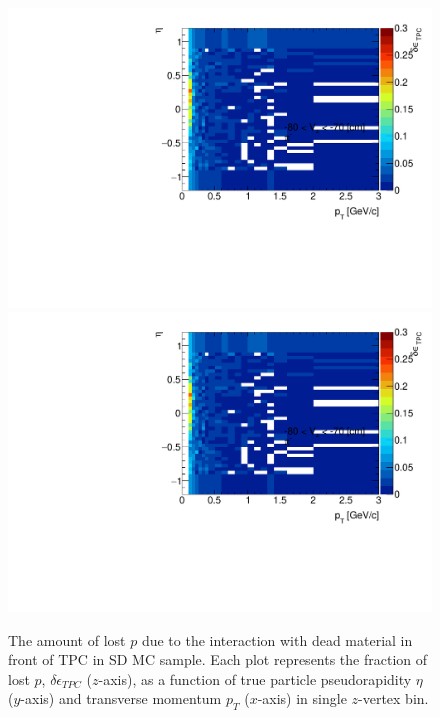 \begin{figure}[H]
	\caption[The amount of lost $p$ due to the interaction with dead material in front of TPC as a function of $p_T$, $\eta$ and $z$-vertex in SD]{The amount of lost $p$ due to the interaction with dead material in front of TPC in SD MC sample. Each plot represents the fraction of lost $p$, $\delta\epsilon_{ TPC}$ ($z$-axis), as a function of true particle pseudorapidity $\eta$ ($y$-axis) and transverse momentum $p_{T}$ ($x$-axis) in single $z$-vertex bin.}\label{fig:dead_materialSD3Dp}
	\parbox{0.325\textwidth}{
		\includegraphics[width=\linewidth,page=81]{graphics/systematicsEfficiency/deadMaterial/secondaries_Unbinned_SD_.pdf}\\
		\includegraphics[width=\linewidth,page=84]{graphics/systematicsEfficiency/deadMaterial/secondaries_Unbinned_SD_.pdf}\\
}
\end{figure}
